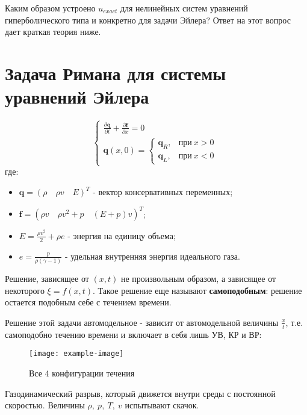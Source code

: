 Каким образом устроено $u_{exact}$ для нелинейных систем уравнений гиперболического типа и конкретно для задачи Эйлера? Ответ на этот вопрос дает краткая теория ниже.

\section{Задача Римана для системы уравнений Эйлера}\label{sect_EulerRiemann}

\begin{equation}
	\begin{cases}
		\frac{\partial \pmb{q}}{\partial t} + \frac{\partial \pmb{f}}{\partial x} = 0\\
		\pmb{q}(x, 0) =
		\begin{cases}
			\pmb{q}_R,&\text{при}\ x>0\\
			\pmb{q}_L,&\text{при}\ x<0
		\end{cases}
	\end{cases}
\end{equation}
где:
\begin{itemize}
	\item $\pmb{q} = (\rho\quad \rho v\quad E)^T$ - вектор консервативных переменных;
	\item $\pmb{f} = (\rho v\quad \rho v^2 + p\quad (E+p)v)^T$;
	\item $E = \frac{\rho v^2}{2} + \rho e$ - энергия на единицу объема;
	\item $e = \frac{p}{\rho(\gamma - 1)}$ - удельная внутренняя энергия идеального газа.
\end{itemize}

\begin{definition}
	Решение, зависящее от $(x, t)$ не произвольным образом, а зависящее от некоторого $\xi = f(x,t)$. Такое решение еще называют \textbf{самоподобным}: решение остается подобным себе с течением времени.
\end{definition}

Решение этой задачи автомодельное - зависит от автомодельной величины $\frac{x}{t}$, т.е. самоподобно течению времени и включает в себя лишь УВ, КР и ВР:

\begin{figure}[H]
	\centering
	
	\texttt{[image: example-image]}
	\caption{Все 4 конфигурации течения}
	\label{fig_4configs}
\end{figure}

\begin{definition}
	Газодинамический разрыв, который движется внутри среды с постоянной скоростью. Величины $\rho,\ p,\ T,\ v$ испытывают скачок.
\end{definition}

